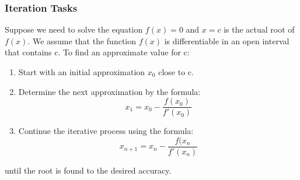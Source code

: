 \documentclass[a4paper, 12pt]{report}
\begin{document}
    \subsubsection{Iteration Tasks}
    Suppose we need to solve the equation $f(x) = 0$ and $x=c$ is the actual root of $f(x)$. We assume that the function $f(x)$ is differentiable in an open interval that contains c.
    To find an approximate value for c:
    \begin{enumerate}
        \item Start with an initial approximation $x_{0}$ close to c.
        \item Determine the next approximation by the formula:
        \begin{equation}
        x_{1} = x_{0} - \frac{f(x_{0})}{f'(x_{0})}
        \end{equation}
        \item Continue the iterative process using the formula:
        \begin{equation}
        x_{n+1} = x_{n} - \frac{f(x_{n}}{f'(x_{n})}
        \end{equation}
    \end{enumerate}
    until the root is found to the desired accuracy.
\end{document}

